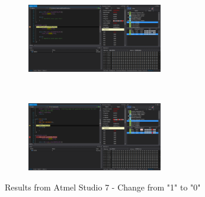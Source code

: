 \documentclass{article}
\begin{document}
\begin{figure}[h!]
		\begin{subfigure}[t]{0.5\textwidth}
			\centering
			\includegraphics[height=3cm, width=\linewidth]{./results/lab9_sim_c_b.png}
		\end{subfigure}%
		~
		\begin{subfigure}[t]{0.5\textwidth}
			\centering
			\includegraphics[height=3cm, width=\linewidth]{./results/lab9_sim_d_b.png}
		\end{subfigure}
		\caption{Results from Αtmel Studio 7 - Change from "1" to "0"}
	\end{figure}
\end{document}
